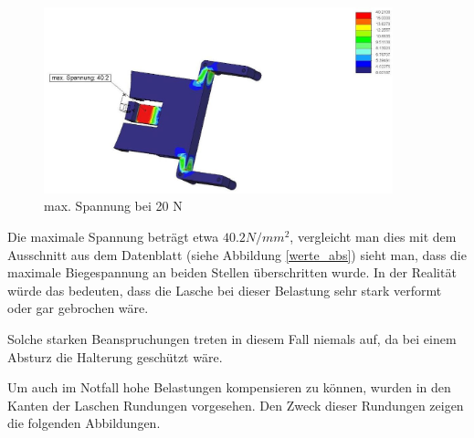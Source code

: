 			\begin{figure}[H]
			\begin{centering}
			\includegraphics[width = 0.9\textwidth]{Bilder/max_spannung_f20_r0_5_oben}
			\par\end{centering}
			\caption{max. Spannung bei 20 N}
			\label{max_spannung_f20_r0_5_oben}
			\end{figure}


	Die maximale Spannung beträgt etwa $40.2 N/mm^{2}$, vergleicht man dies mit dem Ausschnitt aus dem Datenblatt (siehe Abbildung \ref{werte_abs}) sieht man,
	dass die maximale Biegespannung an beiden Stellen überschritten wurde. In der Realität würde das bedeuten, dass die Lasche bei dieser Belastung sehr stark verformt oder gar gebrochen wäre.

	Solche starken Beanspruchungen treten in diesem Fall niemals auf, da  bei einem Absturz die Halterung geschützt wäre.

	Um auch im Notfall hohe Belastungen kompensieren zu können, wurden in den Kanten der Laschen Rundungen vorgesehen. Den Zweck dieser Rundungen zeigen die folgenden Abbildungen.

